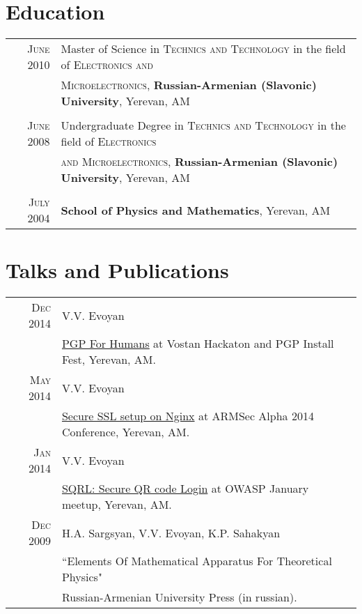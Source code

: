 \documentclass[a4paper,10pt]{article}
\begin{document}
\section{Education}
\begin{tabular}{rl}
  \textsc{June} 2010
    & Master of Science in \textsc{Technics and Technology}
      in the field of \textsc{Electronics and} \\ & \textsc{Microelectronics}, 
    \textbf{Russian-Armenian (Slavonic) University}, Yerevan, AM \\
  & \\
  \textsc{June} 2008
    & Undergraduate Degree in \textsc{Technics and Technology}
      in the field of \textsc{Electronics} \\ & \textsc{and Microelectronics}, 
    \textbf{Russian-Armenian (Slavonic) University}, Yerevan, AM \\
  & \\
  \textsc{July} 2004
  & \textbf{School of Physics and Mathematics}, Yerevan, AM
\end{tabular}


\section{Talks and Publications}
\begin{tabular}{rl}
  \textsc{Dec} 2014
    & V.V. Evoyan \\
    & \href{http://vahe-evoyan.github.io/pgp-for-dummies/}{PGP For Humans}
      at Vostan Hackaton and PGP Install Fest, Yerevan, AM. \\
  \textsc{May} 2014
    & V.V. Evoyan \\ &
    \href{http://vahe-evoyan.github.io/nginxssl-presentation/}
         {Secure SSL setup on Nginx} at ARMSec Alpha 2014 Conference,
         Yerevan, AM. \\
  \textsc{Jan} 2014
    & V.V. Evoyan \\
    & \href{https://prezi.com/qpgpm6zuxirv/sqrl}{SQRL: Secure QR code Login}
      at OWASP January meetup, Yerevan, AM. \\
  \textsc{Dec} 2009
    & H.A. Sargsyan, V.V. Evoyan, K.P. Sahakyan \\
    & ``Elements Of Mathematical Apparatus For Theoretical Physics" \\
    & Russian-Armenian University Press (in russian).
\end{tabular}


\end{document}
